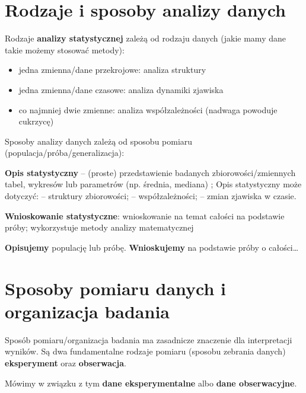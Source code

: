 \documentclass[
  openany]{book}
\begin{document}
\hypertarget{rodzaje-i-sposoby-analizy-danych}{%
\section{Rodzaje i sposoby analizy danych}\label{rodzaje-i-sposoby-analizy-danych}}

Rodzaje \textbf{analizy statystycznej} zależą od rodzaju danych
(jakie mamy dane takie możemy stosować metody):

\begin{itemize}
\item
  jedna zmienna/dane przekrojowe: analiza struktury
\item
  jedna zmienna/dane czasowe: analiza dynamiki zjawiska
\item
  co najmniej dwie zmienne: analiza współzależności (nadwaga powoduje cukrzycę)
\end{itemize}

Sposoby analizy danych zależą od sposobu pomiaru (populacja/próba/generalizacja):

\textbf{Opis statystyczny} -- (proste) przedstawienie badanych zbiorowości/zmiennych
tabel, wykresów lub parametrów (np. średnia, mediana) ;
Opis statystyczny może dotyczyć: -- struktury zbiorowości; -- współzależności; --
zmian zjawiska w czasie.

\textbf{Wnioskowanie statystyczne}: wnioskowanie na temat całości na podstawie próby;
wykorzystuje metody analizy matematycznej

\textbf{Opisujemy} populację lub próbę. \textbf{Wnioskujemy} na podstawie próby o całości\ldots{}

\hypertarget{sposoby-pomiaru-danych-i-organizacja-badania}{%
\section{Sposoby pomiaru danych i organizacja badania}\label{sposoby-pomiaru-danych-i-organizacja-badania}}

Sposób pomiaru/organizacja badania ma zasadnicze znaczenie dla interpretacji wyników.
Są dwa fundamentalne rodzaje pomiaru
(sposobu zebrania danych) \textbf{eksperyment} oraz \textbf{obserwacja}.

Mówimy w związku z tym \textbf{dane eksperymentalne} albo \textbf{dane obserwacyjne}.
\end{document}
